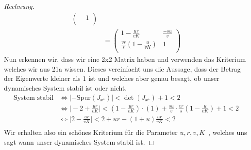 \documentclass[a4paper]{article}
\begin{document}
\begin{theorem}
\begin{proof}[Rechnung]
\begin{align*}
\begin{pmatrix}
						& 1 \\
			\end{pmatrix} \\
				   &= \begin{pmatrix} 
					   1 - \frac{ ur }{ vK } & \frac{ -su }{ v } \\
					   \frac{ vr }{ s } ( 1 - \frac{ u }{ vK } ) & 1 \\
				   \end{pmatrix} 
		\end{align*}
		Nun erkennen wir, dass wir eine 2x2 Matrix haben und verwenden das Kriterium welches wir aus 21a wissen.
		Dieses vereinfacht uns die Aussage, dass der Betrag der Eigenwerte kleiner als $1$ ist und welches
		aber genau besagt, ob unser dynamisches System stabil ist oder nicht.
		\begin{align*}
			\text{System stabil} & \Leftrightarrow
			| - \text{Spur} (J_{x ^{\star}}) | < \det (J_{x ^{\star}}) + 1 < 2 \\
				 & \Leftrightarrow \Big | -2 + \frac{ ur }{ vK } \Big |
				 < \left(
				 	1 - \frac{ ur }{ vK }
				\right) \cdot (1) + \frac{ su }{ v } \cdot \frac{ vr }{ s } \left(
					1 - \frac{ u }{ vK }
				\right) + 1 < 2 \\
				 & \Leftrightarrow \Big | 2 - \frac{ ur }{ vK } \Big |
				 < 2 + ur - (1 + u) \frac{ ur }{ vK } < 2 \\
		\end{align*}
		Wir erhalten also ein schönes Kriterium für die Parameter $u, r, v, K$\, , welches uns sagt
		wann unser dynamisches System stabil ist.
	\end{proof}
	\end{theorem}
\end{document}
